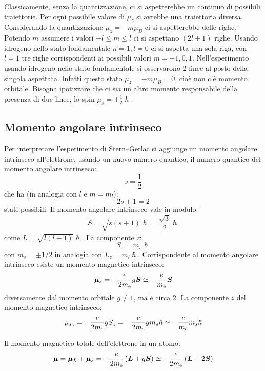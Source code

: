 Classicamente, senza la quantizzazione, ci si aspetterebbe un continuo di possibili traiettorie. Per ogni possibile valore di $\mu_z$ si avrebbe una traiettoria diversa. Considerando la quantizzazione $\mu_z=-m\mu_B$ ci si aspetterebbe delle righe. Potendo $m$ assumere i valori $-l\leq m\leq l$ ci si aspettano $(2l+1)$ righe. Usando idrogeno nello stato fondamentale $n=1, l=0$ ci si aspetta una sola riga, con $l=1$ tre righe corrispondenti ai possibili valori $m=-1,0,1$. Nell'esperimento usando idrogeno nello stato fondamentale si osservarono 2 linee al posto della singola aspettata. Infatti questo stato $\mu_z=-m\mu_B=0$, cioè non c'è momento orbitale. Bisogna ipotizzare che ci sia un altro momento responsabile della presenza di due linee, lo spin $\mu_s=\pm\frac{1}{2}\hslash$.
\subsection{Momento angolare intrinseco}
Per interpretare l'esperimento di Stern--Gerlac si aggiunge un momento angolare intrinseco all'elettrone, usando un nuovo numero quantico, il numero quantico del momento angolare intrinseco:
\begin{equation}
	s=\frac{1}{2}
\end{equation}
che ha (in analogia con $l$ e $m=m_l$):
\begin{equation}
	2s+1=2
\end{equation}
stati possibili. Il momento angolare intrinseco vale in modulo:
\begin{equation}
	S=\sqrt{s(s+1)}\hslash=\frac{\sqrt{3}}{2}\hslash
\end{equation}
come $L=\sqrt{l(l+1)}\hslash$. La componente $z$:
\begin{equation}
	S_z=m_s\hslash
\end{equation}
con $m_s=\pm 1/2$ in analogia con $L_z=m_l\hslash$. Corrispondente al momento angolare intrinseco esiste un momento magnetico intrinseco:
\begin{equation}
	\boldsymbol{\mu}_s=-\frac{e}{2m_{\mathrm{e}}}g\boldsymbol{S}\simeq -\frac{e}{m_{\mathrm{e}}}\boldsymbol{S}
\end{equation}
diversamente dal momento orbitale $g\neq 1$, ma è circa 2. La componente $z$ del momento magnetico intrinseco:
\begin{equation}
	\mu_{sz}=-\frac{e}{2m_{\mathrm{e}}}g S_z=-\frac{e}{2m_{\mathrm{e}}}gm_s\hslash\simeq-\frac{e}{m_{\mathrm{e}}}m_s\hslash
\end{equation}

Il momento magnetico totale dell'elettrone in un atomo:
\begin{equation}
	\boldsymbol{\mu}=\boldsymbol{\mu}_L+\boldsymbol{\mu}_s=-\frac{e}{2m_{\mathrm{e}}}\left(\boldsymbol{L}+g\boldsymbol{S}\right)\simeq-\frac{e}{2m_{\mathrm{e}}}\left(\boldsymbol{L}+2\boldsymbol{S}\right)
\end{equation}
